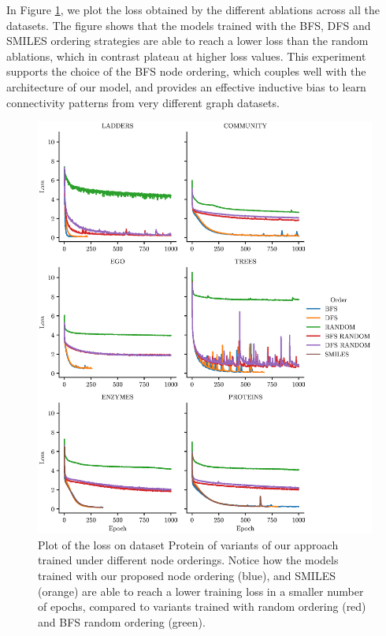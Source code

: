 In Figure \ref{fig:loss}, we plot the loss obtained by the different ablations across all the datasets. The figure shows that the models trained with the BFS, DFS and SMILES ordering strategies are able to reach a lower loss than the random ablations, which in contrast plateau at higher loss values. This experiment supports the choice of the BFS node ordering, which couples well with the architecture of our model, and provides an effective inductive bias to learn connectivity patterns from very different graph datasets.

\begin{figure}[h!]
\centering
\includegraphics[width=\textwidth]{Figures/Chapter6/loss.eps}
\caption{Plot of the loss on dataset Protein of variants of our approach trained under different node orderings. Notice how the models trained with our proposed node ordering (blue), and SMILES (orange) are able to reach a lower training loss in a smaller number of epochs, compared to variants trained with random ordering (red) and BFS random ordering (green).}
\label{fig:loss}
\end{figure}
